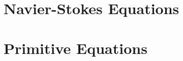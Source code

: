 \documentclass[10pt]{article}
\begin{document}
	\section{Navier-Stokes Equations}
		
	\section{Primitive Equations}
		
\end{document}
